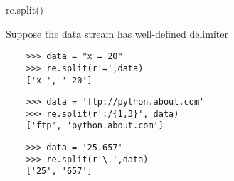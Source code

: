 \begin{frame}[fragile]{re.split()}

  Suppose the data stream has well-defined delimiter

  \vspace{0.4cm}
  \begin{verbatim}
    >>> data = "x = 20"
    >>> re.split(r'=',data)
    ['x ', ' 20']
  \end{verbatim}
  \vspace{0.2cm}
  \pause
  \begin{verbatim} 
    >>> data = 'ftp://python.about.com'
    >>> re.split(r':/{1,3}', data)
    ['ftp', 'python.about.com']
  \end{verbatim}
  \vspace{0.2cm}
  \pause
  \begin{verbatim}
    >>> data = '25.657'
    >>> re.split(r'\.',data)
    ['25', '657']
  \end{verbatim}


\end{frame}

